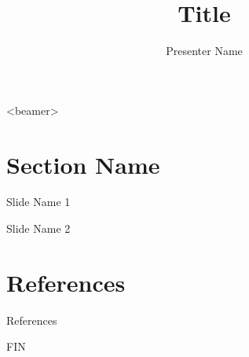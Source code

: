 \documentclass[singlespace]{Presentation}
\subtitle{}
\institute[Duke University]{Mechanical Engineering \\Duke University }
\author{Presenter Name}
\title{Title}
\begin{document}
\maketitle

\begin{frame}<beamer>
\frametitle{}
\tableofcontents
\end{frame}

\section{Section Name}
\begin{frame}{Slide Name 1}
\end{frame}

\begin{frame}{Slide Name 2}
\end{frame}

\section{References}
\begin{frame}[allowframebreaks]{References}
  \nocite{*}
  \printbibliography
\end{frame}

\begin{frame}{}
\centerline{\Huge FIN}
\end{frame}
\end{document}
